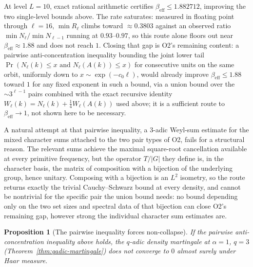 \documentclass[11pt]{article}
\newtheorem{proposition}[theorem]{Proposition}
\theoremstyle{definition}
\theoremstyle{remark}
\begin{document}
At level $L=10$, exact rational arithmetic certifies
$\beta_{\mathrm{eff}}\le1.882712$, improving the two single-level
bounds above. The rate saturates: measured in
floating point through $\ell=16$, $\min R_\ell$ climbs toward
$\approx0.3803$ against an observed ratio $\min N_\ell/\min N_{\ell-1}$
running at $0.93$--$0.97$, so this route alone floors out near
$\beta_{\mathrm{eff}}\approx1.88$ and does not reach $1$. Closing that
gap is O2's remaining content: a pairwise anti-concentration
inequality bounding the joint lower tail
$\Pr(N_\ell(k)\le x\text{ and }N_\ell(A(k))\le x)$ for consecutive
units on the same orbit, uniformly down to $x\sim\exp(-c_0\ell)$, would
already improve $\beta_{\mathrm{eff}}\le1.88$ toward $1$ for any fixed
exponent in such a bound, via a union bound over the $\sim3^{\ell-1}$
pairs combined with the exact recursive identity
$W_\ell(k)=N_\ell(k)+\tfrac14W_\ell(A(k))$ used above; it is a
sufficient route to $\beta_{\mathrm{eff}}\to1$, not shown here to be
necessary.

A natural attempt at that pairwise inequality, a $3$-adic Weyl-sum
estimate for the mixed character sums attached to the two pair types of
O2, fails for a structural reason. The relevant sums achieve the
maximal square-root cancellation available at every primitive
frequency, but the operator $T/|G|$ they define is, in the character
basis, the matrix of composition with a bijection of the underlying
group, hence unitary. Composing with a bijection is an $L^2$ isometry,
so the route returns exactly the trivial Cauchy--Schwarz bound at every
density, and cannot be nontrivial for the specific pair the union bound
needs: no bound depending only on the two set sizes and spectral data
of that bijection can close O2's remaining gap, however strong the
individual character sum estimates are.

\begin{proposition}[The pairwise inequality forces non-collapse]
\label{prop:pairwise-nonsingular}
If the pairwise anti-concentration inequality above holds, the
$q$-adic density martingale at $\alpha=1$, $q=3$
(Theorem~\ref{thm:qadic-martingale}) does not converge to $0$ almost
surely under Haar measure.
\end{proposition}
\end{document}
